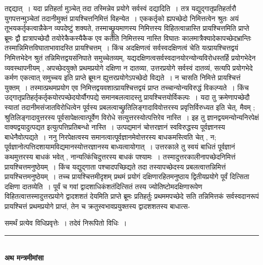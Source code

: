 \documentclass[11pt, openany]{book}
\newcommand\alfootnote[1]{%
  \begingroup
  \renewcommand\thefootnoteA{}\footnoteA{#1}%
  \addtocounter{footnoteA}{-1}%
  \endgroup
}
\begin{document}
तद्दद्यात्~। यदा प्रतिहर्ता मुञ्चेत् तदा तस्मिन्नेव प्रयोगे सर्वस्वं दद्यादिति~। तत्र यद्युद्गातृप्रतिहर्तारौ युगपत्तन्मुञ्चेतां तदानीमुक्तं प्रायश्चित्तनिमित्तं विहन्येत~। एककर्तृको ह्यपच्छेदो निमित्तत्वेन श्रुतः अयं तूभयकर्तृकत्वान्नैकेन व्यपदेष्टुं शक्यते, तस्माच्छ्रूयमाणस्य निमित्तस्य विहितत्वान्नास्ति प्रायश्चित्तमिति प्राप्ते ब्रूमः {\qt द्वौ ह्यत्रापच्छेदौ तयोरेकैकस्यैकैक एव कर्तेति निमित्तस्य नास्ति विघातः कालमात्रैक्यादेकापच्छेदभ्रान्तिः तस्मान्निमित्तविघाताभावादस्ति प्रायश्चित्तम्~}। किंच अदक्षिणत्वं सर्वस्वदक्षिणत्वं चेति यत्प्रायश्चित्तद्वयं निमित्तभेदेन श्रुतं तन्निमित्तद्वयसंनिपाते समुच्चेतव्यम्, यद्यदक्षिणत्वसर्वस्वदानयोरन्योन्यविरोधस्तर्हि प्रयोगभेदेन व्यवस्थापनीयम् , अपच्छेदयुक्ते प्रथमप्रयोगे दक्षिणा न दातव्या, उत्तरप्रयोगे सर्वस्वं दातव्यं, सत्यपि प्रयोगभेदे कर्मण एकत्वात् समुच्चय इति प्राप्ते ब्रूमः{\qt  न ह्युत्तरप्रयोगेऽपच्छेदो विद्यते~}। न चासति निमित्ते प्रायश्चित्तं युक्तम्~। तस्मात्प्रथमप्रयोग एव निमित्तद्वयवशात्प्रायश्चित्तद्वयं प्राप्त तच्चान्योन्यविरुद्धं विकल्प्यते~। किंच उद्गातृप्रतिहर्तृकर्तृकयोरपच्छेदयोर्यौगपद्ये समानबलत्वादस्तु प्रायश्चित्तयोर्विकल्पः~। यदा तु क्रमेणापच्छेदौ स्यातां तदानीमसंजातविरोधित्वेन पूर्वस्य प्रबलत्वाच्छ्रुतिलिङ्गादाविवोत्तरस्य प्रवृत्तिर्विरुध्यत इति चेत्, {\qt मैवम्} ; श्रुतिलिङ्गादावुत्तरस्य पूर्वसापेक्षत्वात्पूर्वेण विरोधे सत्युत्तरस्योत्पत्तिरेव नास्ति~। इह तु ज्ञानद्वयमन्योन्यनिरपेक्षं वाक्यद्वयादुत्पद्यत इत्युत्पत्तिप्रतिबन्धो नास्ति~। उत्पद्यमानं चोत्तरज्ञानं स्वविरुद्धस्य पूर्वज्ञानस्य बाधेनैवोत्पद्यते~। {\br ननु} निरपेक्षत्वस्य समानत्वात्पूर्वज्ञानमेवोत्तरस्य बाधकमस्त्विति चेत् , {\qt न}; पूर्वज्ञानोत्पत्तिदशायामविद्यमानस्योत्तरज्ञानस्य बाध्यत्वायोगात्~। उत्तरकाले तु स्वयं बाधितं पूर्वज्ञानं कथमुत्तरस्य बाधकं भवेत् , नान्यत्किंचिदुत्तरस्य बाधकं पश्यामः~। तस्मादुत्तरकालीनापच्छेदनिमित्तं प्रायश्चित्तमनुष्ठेयम्~। किंच यद्युद्गाता पश्चादपच्छिद्यते तदा तस्यापच्छेदस्य प्रबलत्वात्तन्निमित्तं प्रायश्चित्तमनुष्ठेयम्~। तच्च प्रायश्चित्तमीदृशम् {\qt प्रथमं प्रयोगं  दक्षिणारहितमनुष्ठाय द्वितीयप्रयोगे पूर्वं दित्सिता दक्षिणा दातव्येति~}। पूर्वं च गवां द्वादशाधिकं\footnotemarkA[1] शतंदित्सितं तस्य ज्योतिष्टोमदक्षिणारूपेण विहितत्वात्तस्मादुत्तरप्रयोगे द्वादशशतं देयमिति प्राप्ते ब्रूमः  {\qt प्रतिहर्तुः प्रथममपच्छेदे सति तन्निमित्तकं सर्वस्वदानरूपं प्रायश्चित्तं प्रथमप्रयोगे प्राप्तं, तेन च
क्रतुस्वभावप्रयुक्तस्य द्वादशशतस्य बाधात्स}-
\alfootnote{टिप्प०\textemdash\ $^{1}$द्वादशाधिकं शतमित्यर्थः, एवमुत्तरत्रापि~।}
\newpage
\fancyhead[RE]{[नियम\textemdash\ }
{\bl\noindent समर्थं प्रत्येव विधिप्रवृत्तेः~। तदेवं निरूपितो विधिः~।}
\begin{center}
    \rule{.15\linewidth}{1pt}\\
    \vspace{2mm}
 \textbf{अथ मन्त्रमीमांसा}   
\end{center}
\end{document}
